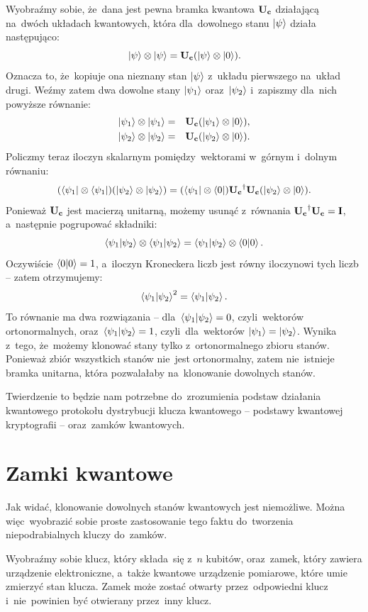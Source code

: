 Wyobraźmy sobie, że~dana jest pewna bramka kwantowa $\mathbf{U_c}$ działającą
na~dwóch układach kwantowych, która dla~dowolnego stanu $\ket{\psi}$
działa następująco:
$$
	\ket{\psi}\otimes \ket{\psi} = \mathbf{U_c} (\ket{\psi}\otimes\ket{0}).
$$
Oznacza to, że~kopiuje ona nieznany stan $\ket{\psi}$ z~układu pierwszego na~układ drugi.
Weźmy zatem dwa dowolne stany $\ket{\psi_1}$ oraz~$\ket{\psi_2}$ i~zapiszmy dla~nich powyższe równanie:
\begin{eqnarray}
	\ket{\psi_1}\otimes \ket{\psi_1} &=& \mathbf{U_c} (\ket{\psi_1}\otimes\ket{0}),\nonumber\\
	\ket{\psi_2}\otimes \ket{\psi_2} &=& \mathbf{U_c} (\ket{\psi_2}\otimes\ket{0}).\nonumber
\end{eqnarray}
Policzmy teraz iloczyn skalarnym pomiędzy~wektorami w~górnym i~dolnym równaniu:
$$
	(\bra{\psi_1}\otimes \bra{\psi_1})(\ket{\psi_2}\otimes \ket{\psi_2}) =  (\bra{\psi_1}\otimes\bra{0}) \mathbf{U_c}^\dagger \mathbf{U_c} (\ket{\psi_2}\otimes\ket{0}).
$$
Ponieważ $\mathbf{U_c}$ jest macierzą unitarną, możemy usunąć z~równania $\mathbf{U_c}^\dagger \mathbf{U_c} =\mathbf{I}$, a~następnie pogrupować składniki:
$$
	\braket{\psi_1}{\psi_2} \otimes \braket{\psi_1}{\psi_2} =  \braket{\psi_1}{\psi_2}\otimes\braket{0}{0}.
$$
Oczywiście $\braket{0}{0}=1$, a~iloczyn Kroneckera liczb jest równy iloczynowi tych liczb -- zatem otrzymujemy:
$$
	\braket{\psi_1}{\psi_2}^2 = \braket{\psi_1}{\psi_2}.
$$
To równanie ma dwa rozwiązania -- dla~$\braket{\psi_1}{\psi_2}=0$, czyli~wektorów
ortonormalnych, oraz~$\braket{\psi_1}{\psi_2}=1$, czyli~dla~wektorów $\ket{\psi_1}=\ket{\psi_2}$.
Wynika z~tego, że~możemy klonować stany tylko z~ortonormalnego zbioru stanów. Ponieważ
zbiór wszystkich stanów nie~jest ortonormalny, zatem nie~istnieje bramka unitarna,
która pozwalałaby na~klonowanie dowolnych stanów.

Twierdzenie to będzie nam potrzebne do~zrozumienia podstaw działania kwantowego
protokołu dystrybucji klucza kwantowego -- podstawy kwantowej kryptografii --
oraz~zamków kwantowych.

\section{Zamki kwantowe}
Jak widać, klonowanie dowolnych stanów kwantowych jest niemożliwe. Można więc~wyobrazić
sobie proste zastosowanie tego faktu do~tworzenia niepodrabialnych
kluczy do~zamków.

Wyobraźmy sobie klucz, który składa~się z~$n$ kubitów, oraz~zamek, który zawiera
urządzenie elektroniczne, a~także kwantowe urządzenie pomiarowe, które umie zmierzyć
stan klucza. Zamek może zostać otwarty przez~odpowiedni klucz
i~nie~powinien być otwierany przez~inny klucz.

